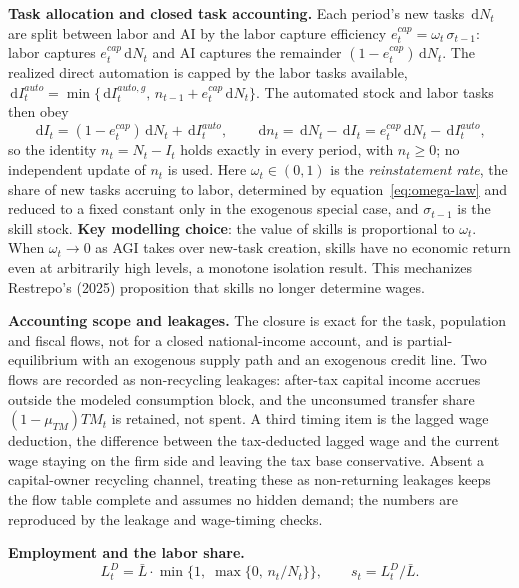 \documentclass[review,12pt]{elsarticle}
\theoremstyle{plain}
\theoremstyle{definition}
\theoremstyle{remark}
\newcommand{\dd}{\,\mathrm{d}}
\newcommand{\barL}{\bar{L}}
\begin{document}
\textbf{Task allocation and closed task accounting.} Each period's new tasks $\dd N_t$ are split between labor and AI by the labor capture efficiency $e_t^{cap}=\omega_t\,\sigma_{t-1}$: labor captures $e_t^{cap}\dd N_t$ and AI captures the remainder $(1-e_t^{cap})\dd N_t$. The realized direct automation is capped by the labor tasks available, $\dd I_t^{auto}=\min\{\dd I_t^{auto,g},\,n_{t-1}+e_t^{cap}\dd N_t\}$. The automated stock and labor tasks then obey
\begin{equation}
\dd I_t=(1-e_t^{cap})\dd N_t+\dd I_t^{auto},\qquad
\dd n_t=\dd N_t-\dd I_t=e_t^{cap}\dd N_t-\dd I_t^{auto},
\end{equation}
so the identity $n_t=N_t-I_t$ holds exactly in every period, with $n_t\ge0$; no independent update of $n_t$ is used. Here $\omega_t\in(0,1)$ is the \emph{reinstatement rate}, the share of new tasks accruing to labor, determined by equation~\eqref{eq:omega-law} and reduced to a fixed constant only in the exogenous special case, and $\sigma_{t-1}$ is the skill stock. \textbf{Key modelling choice}: the value of skills is proportional to $\omega_t$. When $\omega_t\to0$ as AGI takes over new-task creation, skills have no economic return even at arbitrarily high levels, a monotone isolation result. This mechanizes Restrepo's (2025) proposition that skills no longer determine wages.

\smallskip\noindent\textbf{Accounting scope and leakages.} The closure is exact for the task, population and fiscal flows, not for a closed national-income account, and is partial-equilibrium with an exogenous supply path and an exogenous credit line. Two flows are recorded as non-recycling leakages: after-tax capital income accrues outside the modeled consumption block, and the unconsumed transfer share $(1-\mu_{TM})TM_t$ is retained, not spent. A third timing item is the lagged wage deduction, the difference between the tax-deducted lagged wage and the current wage staying on the firm side and leaving the tax base conservative. Absent a capital-owner recycling channel, treating these as non-returning leakages keeps the flow table complete and assumes no hidden demand; the numbers are reproduced by the leakage and wage-timing checks.

\textbf{Employment and the labor share.}
\begin{equation}
L_t^D=\barL\cdot\min\{1,\;\max\{0,\,n_t/N_t\}\},\qquad s_t=L_t^D/\barL.
\end{equation}
\end{document}

